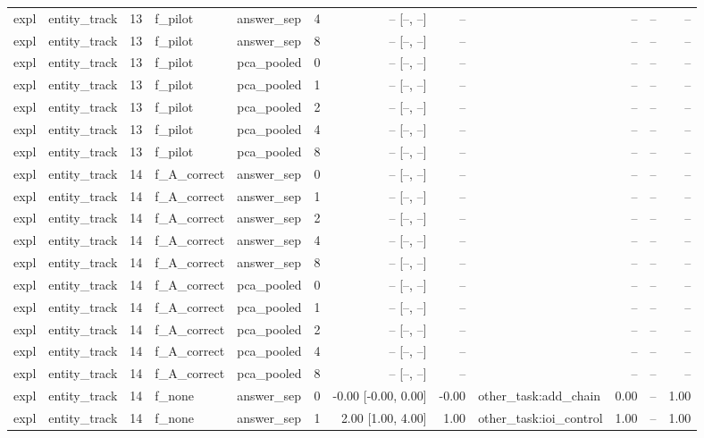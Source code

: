 \begin{tabular}{llrllrrrlrrr}
expl & entity\_track & 13 & f\_pilot & answer\_sep & 4 & -- [--, --] & -- &  & -- & -- & -- \\
expl & entity\_track & 13 & f\_pilot & answer\_sep & 8 & -- [--, --] & -- &  & -- & -- & -- \\
expl & entity\_track & 13 & f\_pilot & pca\_pooled & 0 & -- [--, --] & -- &  & -- & -- & -- \\
expl & entity\_track & 13 & f\_pilot & pca\_pooled & 1 & -- [--, --] & -- &  & -- & -- & -- \\
expl & entity\_track & 13 & f\_pilot & pca\_pooled & 2 & -- [--, --] & -- &  & -- & -- & -- \\
expl & entity\_track & 13 & f\_pilot & pca\_pooled & 4 & -- [--, --] & -- &  & -- & -- & -- \\
expl & entity\_track & 13 & f\_pilot & pca\_pooled & 8 & -- [--, --] & -- &  & -- & -- & -- \\
expl & entity\_track & 14 & f\_A\_correct & answer\_sep & 0 & -- [--, --] & -- &  & -- & -- & -- \\
expl & entity\_track & 14 & f\_A\_correct & answer\_sep & 1 & -- [--, --] & -- &  & -- & -- & -- \\
expl & entity\_track & 14 & f\_A\_correct & answer\_sep & 2 & -- [--, --] & -- &  & -- & -- & -- \\
expl & entity\_track & 14 & f\_A\_correct & answer\_sep & 4 & -- [--, --] & -- &  & -- & -- & -- \\
expl & entity\_track & 14 & f\_A\_correct & answer\_sep & 8 & -- [--, --] & -- &  & -- & -- & -- \\
expl & entity\_track & 14 & f\_A\_correct & pca\_pooled & 0 & -- [--, --] & -- &  & -- & -- & -- \\
expl & entity\_track & 14 & f\_A\_correct & pca\_pooled & 1 & -- [--, --] & -- &  & -- & -- & -- \\
expl & entity\_track & 14 & f\_A\_correct & pca\_pooled & 2 & -- [--, --] & -- &  & -- & -- & -- \\
expl & entity\_track & 14 & f\_A\_correct & pca\_pooled & 4 & -- [--, --] & -- &  & -- & -- & -- \\
expl & entity\_track & 14 & f\_A\_correct & pca\_pooled & 8 & -- [--, --] & -- &  & -- & -- & -- \\
expl & entity\_track & 14 & f\_none & answer\_sep & 0 & -0.00 [-0.00, 0.00] & -0.00 & other\_task:add\_chain & 0.00 & -- & 1.00 \\
expl & entity\_track & 14 & f\_none & answer\_sep & 1 & 2.00 [1.00, 4.00] & 1.00 & other\_task:ioi\_control & 1.00 & -- & 1.00 \\

\end{tabular}
